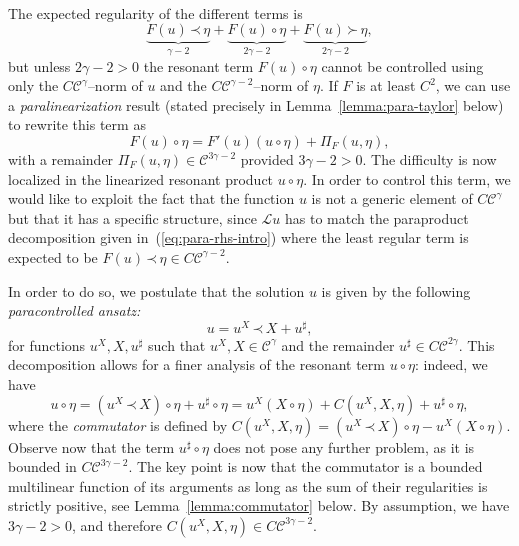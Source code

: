 \documentclass[a4paper,11pt]{article}
\newcommand{\tmem}[1]{{\em #1\/}}
\newcommand{\tmtextit}[1]{{\itshape{#1}}}
\newcommand{\LL}{\mathscr{L}}
\newcommand{\CC}{\mathscr{C}}
\newcommand{\lpara}{\,\mathord{\prec}\,}
\newcommand{\rpara}{\,\mathord{\succ}\,}
\newcommand{\reso}{\,\mathord{\circ}\,}
\begin{document}
\

The expected regularity of the different terms is
\begin{equation}
  \label{eq:para-rhs-intro} \underbrace{F (u) \lpara \eta}_{\gamma - 2} +
  \underbrace{F (u) \reso \eta}_{2 \gamma - 2} + \underbrace{F (u) \rpara
  \eta}_{2 \gamma - 2},
\end{equation}
but unless $2 \gamma - 2 > 0$ the resonant term $F (u) \reso \eta$ cannot be
controlled using only the $C \CC^{\gamma}$--norm of $u$ and the $C \CC^{\gamma
- 2}$--norm of $\eta$. If $F$ is at least $C^2$, we can use a
{\tmem{paralinearization}} result (stated precisely in
Lemma~\ref{lemma:para-taylor} below) to rewrite this term as
\begin{equation}
  \label{eq:rde expand Fu} F (u) \reso \eta = F' (u)  (u \reso \eta) + \Pi_F
  (u, \eta),
\end{equation}
with a remainder $\Pi_F (u, \eta) \in \CC^{3 \gamma - 2}$ provided $3 \gamma -
2 > 0$. The difficulty is now localized in the linearized resonant product $u
\reso \eta$. In order to control this term, we would like to exploit the fact
that the function $u$ is not a generic element of $C \CC^{\gamma}$ but that it
has a specific structure, since $\LL u$ has to match the paraproduct
decomposition given in~(\ref{eq:para-rhs-intro}) where the least regular term
is expected to be $F (u) \lpara \eta \in C \CC^{\gamma - 2}$.

In order to do so, we postulate that the solution $u$ is given by the
following \tmtextit{paracontrolled ansatz:}
\[ u = u^X \lpara X + u^{\sharp}, \]
for functions $u^X, X, u^{\sharp}$ such that $u^X, X \in \CC^{\gamma}$ and the
remainder $u^{\sharp} \in C \CC^{2 \gamma}$. This decomposition allows for a
finer analysis of the resonant term $u \reso \eta$: indeed, we have
\begin{equation}
  \label{eq:rde expand resonant term} u \reso \eta = (u^X \lpara X) \reso \eta
  + u^{\sharp} \reso \eta = u^X  (X \reso \eta) + C (u^X, X, \eta) +
  u^{\sharp} \reso \eta,
\end{equation}
where the {\tmem{commutator}} is defined by $C (u^X, X, \eta) = (u^X \lpara X)
\reso \eta - u^X  (X \reso \eta)$. Observe now that the term $u^{\sharp} \reso
\eta$ does not pose any further problem, as it is bounded in $C \CC^{3 \gamma
- 2}$. The key point is now that the commutator is a bounded multilinear
function of its arguments as long as the sum of their regularities is strictly
positive, see Lemma~\ref{lemma:commutator} below. By assumption, we have $3
\gamma - 2 > 0$, and therefore $C (u^X, X, \eta) \in C \CC^{3 \gamma - 2}$.
\end{document}
